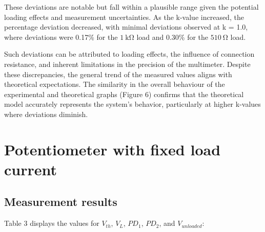 \documentclass[a4paper]{article}
\newcommand{\unit}[1]{~\mathrm{#1}}
\begin{document}
These deviations are notable but fall within a plausible range given the potential loading effects and measurement uncertainties. 
As the k-value increased, the percentage deviation decreased, with minimal deviations observed at k = 1.0, 
where deviations were 0.17\% for the $1 \unit{k\Omega}$ load and 0.30\% for the $510\unit{\Omega}$ load.

Such deviations can be attributed to loading effects, 
the influence of connection resistance, and inherent limitations in the precision of the multimeter. 
Despite these discrepancies, the general trend of the measured values aligns with theoretical expectations. 
The similarity in the overall behaviour of the experimental and theoretical graphs (Figure 6) 
confirms that the theoretical model accurately represents the system's behavior, 
particularly at higher k-values where deviations diminish.

\section{Potentiometer with fixed load current}
\subsection{Measurement results}
Table 3 displays the values for $V_{th}$, $V_{L}$, $PD_1$, $PD_2$, and
$V_{unloaded}$:
\end{document}
